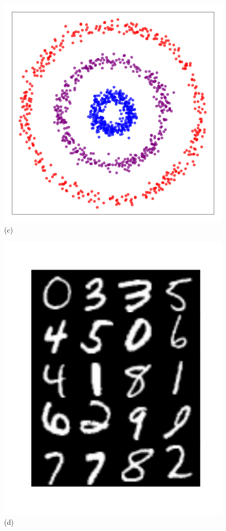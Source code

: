 \documentclass[aps,preprint,nofootinbib,floatfix]{revtex4-1}
\begin{document}
\begin{figure}
\begin{minipage}{0.25\textwidth}
\end{minipage}
\begin{minipage}{0.25\textwidth}
\includegraphics[width=1\textwidth]{3circles.pdf}\\[-1em] (c)  
\end{minipage}
\begin{minipage}{0.22\textwidth}
\vspace{-0.3em}
\includegraphics[width=1\textwidth]{mnist.pdf}\\[-1.8em] (d)  

\end{minipage}
\end{figure}
\end{document}
